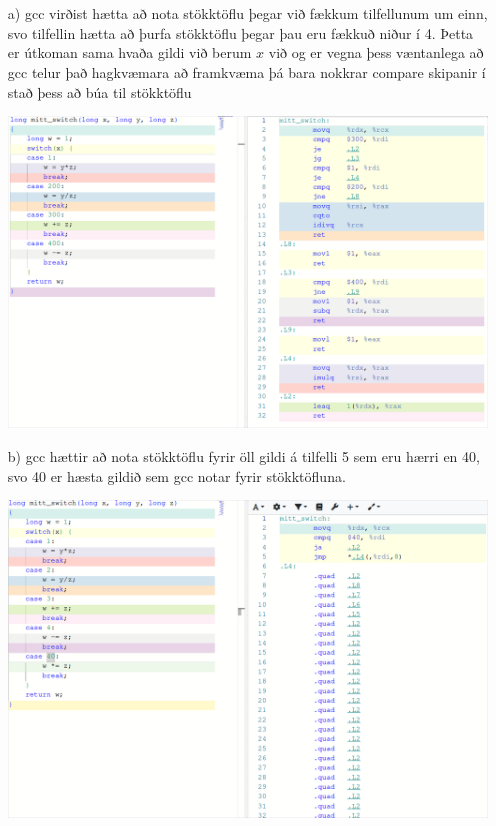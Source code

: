 \documentclass{article}
\begin{document}
	\section{}

	\begin{itemize}
		\item[a)] gcc virðist hætta að nota stökktöflu þegar við fækkum 
			tilfellunum um einn, svo tilfellin hætta að þurfa stökktöflu 
			þegar þau eru fækkuð niður í 4. Þetta er útkoman sama hvaða gildi 
			við berum $x$ við og er vegna þess væntanlega að gcc telur það 
			hagkvæmara að framkvæma þá bara nokkrar compare skipanir í stað 
			þess að búa til stökktöflu
			\begin{center}
				\includegraphics[scale=0.3]{less.png}
			\end{center}
		\item[b)] gcc hættir að nota stökktöflu fyrir öll gildi á tilfelli 5 
			sem eru hærri en 40, svo 40 er hæsta gildið sem gcc notar fyrir 
			stökktöfluna.
			\begin{center}
				\includegraphics[scale=0.25]{highest.png}

\end{center}
\end{itemize}
\end{document}
